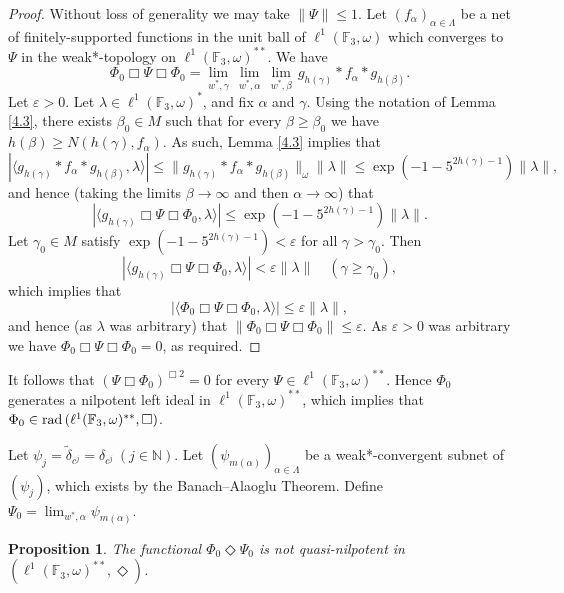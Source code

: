 \documentclass[twoside,11pt]{amsart}
\numberwithin{equation}{section}
\newtheorem{proposition}[theorem]{Proposition}
\theoremstyle{definition}
\newcommand {\N}{\mathbb N}
\newcommand{\rad}{{\rm rad\,}}
\newcommand{\eps}{\varepsilon}
\newcommand{\1}{\mathbbm{1}}
\newcommand{\F}{\mathbb F}
\begin{document}
	\begin{proof}
		Without loss of generality we may take $\| \Psi \| \leq 1$. Let $(f_\alpha)_{\alpha \in \Lambda}$ be a net of finitely-supported functions in the unit ball of $\ell^1(\F_3, \omega)$ which converges to $\Psi$ in the weak*-topology on
		$ \ell^1(\F_3, \omega)^{**}$.
		We have
		$$\Phi_0 \Box \Psi \Box \Phi_0 = \lim_{w^*, \gamma} \, \lim_{w^*, \alpha} \, \lim_{w^*, \beta} \, g_{h(\gamma)}*f_\alpha*g_{h(\beta)}.$$
		Let $\eps >0$. Let $\lambda \in \ell^1(\F_3, \omega)^*$, and fix $\alpha$ and $\gamma$. Using the notation of Lemma \ref{4.3}, there exists $\beta_0 \in M$ such that for every $\beta \geq  \beta_0$ we have $h(\beta) \geq N(h(\gamma), f_\alpha).$ As such, Lemma \ref{4.3} implies that
		\begin{equation*}
			\left| \langle g_{h(\gamma)}*f_\alpha *g_{h(\beta)}, \lambda \rangle \right| \leq \| g_{h(\gamma)}*f_\alpha *g_{h(\beta)} \|_\omega \|\lambda \| 
			\leq \exp(-1- 5^{2h(\gamma) - 1}) \| \lambda \|,
		\end{equation*}
		and hence (taking the limits $\beta \to \infty$ and then $\alpha \to \infty$) that
		$$\left| \langle g_{h(\gamma)} \Box \Psi \Box \Phi_0, \lambda \rangle \right| \leq  \exp(-1- 5^{2h(\gamma) - 1}) \| \lambda \|.$$
		Let $\gamma_0 \in M$ satisfy $\exp(-1-5^{2h(\gamma) - 1}) < \eps$ for all $\gamma > \gamma_0$. Then
		$$\left| \langle g_{h(\gamma)} \Box \Psi \Box \Phi_0, \lambda \rangle \right| < \eps \| \lambda \| \quad (\gamma \geq \gamma_0),$$
		which implies that
		$$\left| \langle \Phi_0 \Box \Psi \Box \Phi_0, \lambda \rangle \right| \leq \eps \| \lambda \|,$$
		and hence (as $\lambda$ was arbitrary) that $\| \Phi_0 \Box \Psi \Box \Phi_0 \| \leq \eps$. As $\eps >0$ was arbitrary we have $\Phi_0 \Box \Psi \Box \Phi_0 = 0$, as required.
	\end{proof}
	
	It follows that $(\Psi \Box \Phi_0)^{\Box 2} = 0$ for every  $\Psi \in \ell^1(\F_3, \omega)^{**}$. Hence $\Phi_0$ generates a nilpotent left ideal in $\ell^1(\F_3, \omega)^{**}$, which implies that $\Phi_0 \in \rad( \ell^1(\F_3, \omega)^{**}, \Box)$.
	
	Let $\psi_j= \widetilde{\delta}_{c^j} = \delta_{c^j} \ (j \in \N)$. Let $(\psi_{m(\alpha)})_{\alpha \in \Lambda}$ be a weak*-convergent subnet of $(\psi_j)$, which exists by the Banach--Alaoglu Theorem. Define $\Psi_0 = \lim_{w^*,\alpha} \psi_{m(\alpha)}$. 
	
	\begin{proposition}		\label{4.5}
		The functional $\Phi_0 \Diamond \Psi_0$ is not quasi-nilpotent in $(\ell^1(\F_3, \omega)^{**}, \Diamond)$.
	\end{proposition}
	
\end{document}
